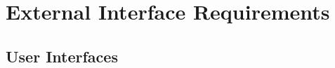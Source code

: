 \documentclass[oneside,a4paper,12pt,explicit]{book}
\begin{document}
\chapter{External Interface Requirements}

\section{User Interfaces}
\end{document}
